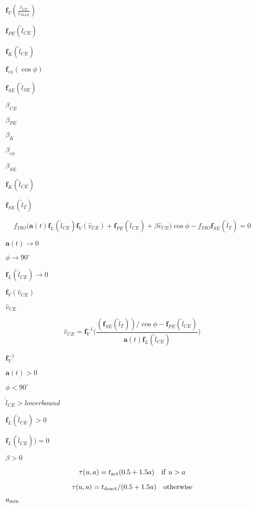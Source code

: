 \documentclass{article}
\begin{document}
$\mathbf{f}_V(\frac{\hat{v}_{CE}}{v_{MAX}})$
\pagebreak

$\mathbf{f}_{PE}(\hat{l}_{CE})$
\pagebreak

$\mathbf{f}_{K}(\hat{l}_{CE})$
\pagebreak

$\mathbf{f}_{c\phi}(\cos \phi)$
\pagebreak

$\mathbf{f}_{SE}(\hat{l}_{SE})$
\pagebreak

$\beta_{CE}$
\pagebreak

$\beta_{PE}$
\pagebreak

$\beta_{K}$
\pagebreak

$\beta_{c \phi}$
\pagebreak

$\beta_{SE}$
\pagebreak

$\mathbf{f}_K(\hat{l}_{CE})$
\pagebreak

$\mathbf{f}_{SE}(\hat{l}_{T})$
\pagebreak

\[ f_{ISO}\Big(\mathbf{a}(t) \mathbf{f}_L(\hat{l}_{CE}) \mathbf{f}_V(\hat{v}_{CE}) + \mathbf{f}_{PE}(\hat{l}_{CE}) + \beta \hat{v}_{CE}\Big) \cos \phi - f_{ISO}\mathbf{f}_{SE}(\hat{l}_{T}) = 0 \]
\pagebreak

$\mathbf{a}(t) \rightarrow 0$
\pagebreak

$\phi \rightarrow 90^\circ$
\pagebreak

$ \mathbf{f}_L(\hat{l}_{CE}) \rightarrow 0 $
\pagebreak

$ \mathbf{f}_V(\hat{v}_{CE}) $
\pagebreak

$ \hat{v}_{CE} $
\pagebreak

\[ \hat{v}_{CE} = \mathbf{f}_V ^{-1} \Big( \frac{ ( \mathbf{f}_{SE}(\hat{l}_{T}) ) / \cos \phi - \mathbf{f}_{PE}(\hat{l}_{CE}) } { \mathbf{a}(t) \mathbf{f}_L(\hat{l}_{CE})} \Big) \]
\pagebreak

$\mathbf{f}_V ^{-1}$
\pagebreak

$\mathbf{a}(t) > 0$
\pagebreak

$\phi < 90^\circ$
\pagebreak

$ \hat{l}_{CE} > lowerbound$
\pagebreak

$ \mathbf{f}_L(\hat{l}_{CE}) > 0 $
\pagebreak

$ \mathbf{f}_L(\hat{l}_{CE})) = 0 $
\pagebreak

$ \beta > 0$
\pagebreak

\[ \tau(u,a) = t_{\rm{act}} (0.5 + 1.5a) \quad {\rm{if}}\ u > a \]
\pagebreak

\[ \tau(u,a) = t_{\rm{deact}} / (0.5 + 1.5a) \quad {\rm{otherwise}} \]
\pagebreak

$a_{\rm{min}}$
\pagebreak
\end{document}
